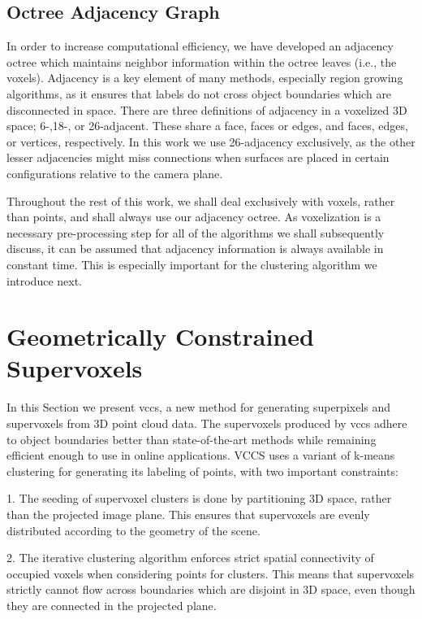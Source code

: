 \subsection{Octree Adjacency Graph}
\label{subsec:Adjacency}
In order to increase computational efficiency, we have developed an adjacency octree which maintains neighbor information within the octree leaves (i.e., the voxels). Adjacency is a key element of many methods, especially region growing algorithms, as it ensures that labels do not cross object boundaries which are disconnected in space. There are three definitions of adjacency in a voxelized 3D space; 6-,18-, or 26-adjacent. These share a face, faces or edges, and faces, edges, or vertices, respectively. In this work we use 26-adjacency exclusively, as the other lesser adjacencies might miss connections when surfaces are placed in certain configurations relative to the camera plane.

Throughout the rest of this work, we shall deal exclusively with voxels, rather than points, and shall always use our adjacency octree. As voxelization is a necessary pre-processing step for all of the algorithms we shall subsequently discuss, it can be assumed that adjacency information is always available in constant time. This is especially important for the clustering algorithm we introduce next.

\section{Geometrically Constrained Supervoxels}
\label{sec:Supervoxels}
In this Section we present  \acrfull{vccs}, a new method for generating superpixels and supervoxels from 3D point cloud data. The supervoxels produced by \gls{vccs} adhere to object boundaries better than state-of-the-art methods while remaining efficient enough to use in online applications. VCCS uses a variant of k-means clustering for generating its labeling of points, with two important constraints:

1. The seeding of supervoxel clusters is done by partitioning 3D space, rather than the projected image plane. This ensures that supervoxels are evenly distributed according to the geometry of the scene.

2. The iterative clustering algorithm enforces strict spatial connectivity of occupied voxels when considering points for clusters. This means that supervoxels strictly cannot flow across boundaries which are disjoint in 3D space, even though they are connected in the projected plane.
 
